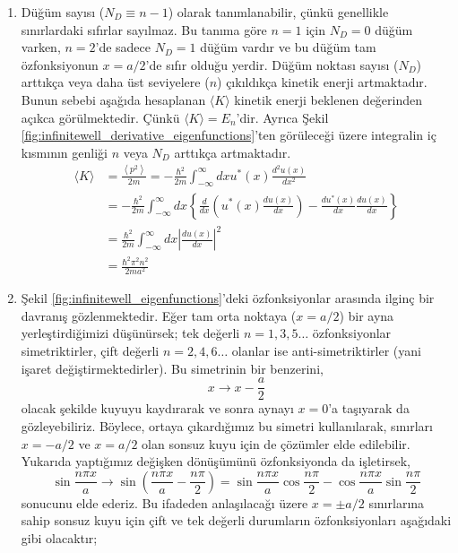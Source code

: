 \documentclass[a4paper,12pt, twoside]{article}
\begin{document}
\begin{enumerate}
	
	\item Düğüm sayısı ($N_D \equiv n-1$) olarak tanımlanabilir, çünkü genellikle sınırlardaki sıfırlar sayılmaz. Bu tanıma göre $n=1$ için $N_D=0$ düğüm varken, $n=2$'de sadece $N_D=1$ düğüm vardır ve bu düğüm tam özfonksiyonun $x=a/2$'de sıfır olduğu yerdir. Düğüm noktası sayısı ($N_D$) arttıkça veya daha üst seviyelere ($n$) çıkıldıkça kinetik enerji artmaktadır. Bunun sebebi aşağıda hesaplanan $\langle K \rangle $ kinetik enerji beklenen değerinden açıkca görülmektedir. Çünkü $\langle K \rangle = E_n$'dir. Ayrıca Şekil \ref{fig:infinitewell_derivative_eigenfunctions}'ten görüleceği üzere integralin iç kısmının genliği $n$ veya $N_D$ arttıkça artmaktadır.
	\begin{equation}
	\begin{aligned} 
	\langle K \rangle 
	& = \frac { \left\langle p ^ { 2 } \right\rangle } { 2 m } = - \frac { \hbar ^ { 2 } } { 2 m } \int _ { - \infty } ^ { \infty } d x u ^ { * } ( x ) \frac { d ^ { 2 } u ( x ) } { d x ^ { 2 } } \\ 
	& = - \frac { \hbar ^ { 2 } } { 2 m } \int _ { - \infty } ^ { \infty } d x \left\{ \frac { d } { d x } \left( u ^ { * } ( x ) \frac { d u ( x ) } { d x } \right) - \frac { d u ^ { * } ( x ) } { d x } \frac { d u ( x ) } { d x } \right\} \\ 
	& = \frac { \hbar ^ { 2 } } { 2 m } \int _ { - \infty } ^ { \infty } d x \left| \frac { d u ( x ) } { d x } \right| ^ { 2 } \\
	&= \frac { \hbar ^ { 2 } \pi ^ { 2 } n ^ { 2 } } { 2 m a ^ { 2 } }
	\end{aligned}
	\end{equation}
		
	
	\item Şekil \ref{fig:infinitewell_eigenfunctions}'deki özfonksiyonlar arasında ilginç bir davranış gözlenmektedir. Eğer tam orta noktaya ($x=a/2$) bir ayna yerleştirdiğimizi düşünürsek; tek değerli $n=1, 3, 5 \ldots$ özfonksiyonlar simetriktirler, çift değerli $n=2, 4, 6 \ldots$ olanlar ise anti-simetriktirler (yani işaret değiştirmektedirler). Bu simetrinin bir benzerini, 
	\begin{equation*}
	x \rightarrow x - \frac { a } { 2 }
	\end{equation*}
	olacak şekilde kuyuyu kaydırarak ve sonra aynayı $x=0$'a taşıyarak da gözleyebiliriz. Böylece, ortaya çıkardığımız bu simetri kullanılarak, sınırları $x=-a/2$ ve $x=a/2$ olan sonsuz kuyu için de çözümler elde edilebilir. Yukarıda yaptığımız değişken dönüşümünü özfonksiyonda da işletirsek,
	\begin{equation}
	\sin \frac { n \pi x } { a } \rightarrow \sin \left( \frac { n \pi x } { a } - \frac { n \pi } { 2 } \right) = \sin \frac { n \pi x } { a } \cos \frac { n \pi } { 2 } - \cos \frac { n \pi x } { a } \sin \frac { n \pi } { 2 }
	\end{equation}
	sonucunu elde ederiz. Bu ifadeden anlaşılacağı üzere $x=\pm a/2$ sınırlarına sahip sonsuz kuyu için çift ve tek değerli durumların özfonksiyonları aşağıdaki gibi olacaktır;
	

\end{enumerate}
\end{document}
